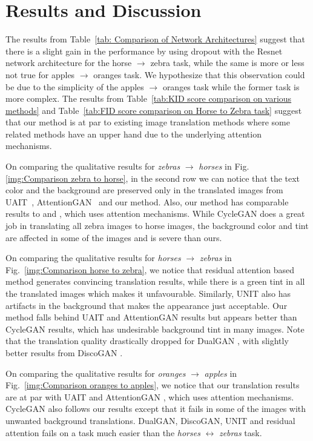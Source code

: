 \documentclass[a4paper,twoside]{article}
\begin{document}
\section{Results and Discussion}
\noindent
The results from Table~\ref{tab: Comparison of Network Architectures} suggest that there is a slight gain in the performance by using dropout with the Resnet network architecture for the horse $\rightarrow$ zebra task, while the same is more or less not true for apples $\rightarrow$ oranges task. We hypothesize that this observation could be due to the simplicity of the apples $\rightarrow$ oranges task while the former task is more complex. The results from Table~\ref{tab:KID score comparison on various methods} and Table~\ref{tab:FID score comparison on Horse to Zebra task} suggest that our method is at par to existing image translation methods where some related methods have an upper hand due to the underlying attention mechanisms.

On comparing the qualitative results for \textit{zebras} $\rightarrow$ \textit{horses} in Fig.\ref{img:Comparison zebra to horse}, in the second row we can notice that the text color and the background are preserved only in the translated images from UAIT~\cite{Mejjati2018UAIT}, AttentionGAN~\cite{attentionGAN} and our method. Also, our method has comparable results to \cite{Mejjati2018UAIT} and \cite{attentionGAN}, which uses attention mechanisms. While CycleGAN does a great job in translating all zebra images to horse images, the background color and tint are affected in some of the images and is severe than ours. 

On comparing the qualitative results for \textit{horses} $\rightarrow$ \textit{zebras} in Fig.~\ref{img:Comparison horse to zebra}, we notice that residual attention based method \cite{Residual-Attention_WangJQYLZWT17} generates convincing translation results, while there is a green tint in all the translated images which makes it unfavourable. Similarly, UNIT \cite{UNIT_LiuBK17} also has artifacts in the background that makes the appearance just acceptable. Our method falls behind UAIT \cite{Mejjati2018UAIT} and AttentionGAN results \cite{attentionGAN} but appears better than CycleGAN results, which has undesirable background tint in many images. Note that the translation quality drastically dropped for DualGAN \cite{DualGAN_YiZTG17}, with slightly better results from DiscoGAN \cite{DiscoGAN_KimCKLK17}.

On comparing the qualitative results for \textit{oranges} $\rightarrow$ \textit{apples} in Fig.~\ref{img:Comparison oranges to apples}, we notice that our translation results are at par with UAIT \cite{Mejjati2018UAIT} and AttentionGAN \cite{attentionGAN}, which uses attention mechanisms. CycleGAN also follows our results except that it fails in some of the images with unwanted background translations. DualGAN, DiscoGAN, UNIT and residual attention \cite{Residual-Attention_WangJQYLZWT17} fails on a task much easier than the \textit{horses} $\leftrightarrow$ \textit{zebras} task.
\end{document}
